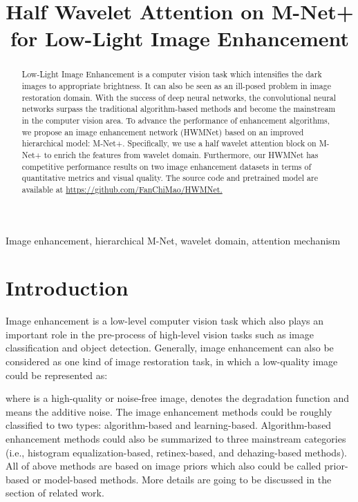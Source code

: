 \documentclass{article}
\title{Half Wavelet Attention on M-Net+ for Low-Light Image Enhancement}
\begin{document}
\maketitle


\begin{abstract}
Low-Light Image Enhancement is a computer vision task which intensifies the dark images to appropriate brightness. It can also be seen as an ill-posed problem in image restoration domain. With the success of deep neural networks, the convolutional neural networks surpass the traditional algorithm-based methods and become the mainstream in the computer vision area. To advance the performance of enhancement algorithms, we propose an image enhancement network (HWMNet) based on an improved hierarchical model: M-Net+. Specifically, we use a half wavelet attention block on M-Net+ to enrich the features from wavelet domain. Furthermore, our HWMNet has competitive performance results on two image enhancement datasets in terms of quantitative metrics and visual quality. The source code and pretrained model are available at \url{https://github.com/FanChiMao/HWMNet.}
\end{abstract}

\begin{keywords}
Image enhancement, hierarchical M-Net, wavelet domain, attention mechanism
\end{keywords}


\section{Introduction}
Image enhancement is a low-level computer vision task which also plays an important role in the pre-process of high-level vision tasks such as image classification and object detection. Generally, image enhancement can also be considered as one kind of image restoration task, in which a low-quality image  could be represented as: 

where  is a high-quality or noise-free image,  denotes the degradation function and  means the additive noise. The image enhancement methods could be roughly classified to two types: algorithm-based and learning-based. Algorithm-based enhancement methods could also be summarized to three mainstream categories (i.e., histogram equalization-based, retinex-based, and dehazing-based methods). All of above methods are based on image priors which also could be called prior-based or model-based methods. More details are going to be discussed in the section of related work.
\end{document}
